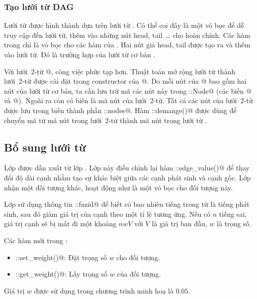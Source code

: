 \documentclass[a4paper,oneside,14pt]{extbook} %
\begin{document}
\subsubsection{Tạo lưới từ DAG}

Lưới từ \verb@DAG@ được hình thành dựa trên lưới từ \verb@Lattice@. Có
thể coi đây là một vỏ bọc để dễ truy cập đến lưới từ, thêm vào những
nút head, tail~\ldots{} cho hoàn chỉnh. Các hàm trong \verb@DAG@ chỉ
là vỏ bọc cho các hàm của \verb@Lattice@. Hai nút giả head, tail được
tạo ra và thêm vào lưới từ. Đó là trường hợp của lưới từ cơ bản
\verb@WordDAG@. 

Với lưới~2-từ @, công việc phức tạp hơn. Thuật toán mở
rộng lưới từ thành lưới~2-từ được cài đặt trong constructor của
@.  Do mỗi nút của @ bao gồm hai nút của
lưới từ cơ bản, ta cần lưu trữ mã các nút này trong
::Node@ (các biến @ và @). Ngoài ra còn
có biến \verb@id@ là mã nút của lưới~2-từ. Tất cả các nút của
lưới~2-từ được lưu trong biến thành phần ::nodes@. Hàm
::demange()@ được dùng để chuyển mã từ mã nút trong
lưới~2-từ thành mã nút trong lưới từ \verb@WordDAG@.



\subsection{Bổ sung lưới từ}

Lớp \verb@PenaltyDAG@ được dẫn xuất từ lớp \verb@DAG@. Lớp này điều
chỉnh lại hàm \verb@DAG::edge_value()@ để thay đổi độ dài cạnh nhằm
tạo sự khác biệt giữa các cạnh phát sinh và cạnh gốc. Lớp nhận một đối
tượng \verb@DAG@ khác, hoạt động như là một vỏ bọc cho đối tượng này.

Lớp sử dụng thông tin \verb@WordEntry::fuzid@ để biết có bao nhiêu
tiếng trong từ là tiếng phát sinh, sau đó giảm giá trị của cạnh theo
một tỉ lệ tương ứng. Nếu có $n$ tiếng sai, giá trị cạnh sẽ bị mất đi
một khoảng $nwV$
với $V$ là giá trị ban đầu, $w$ là trọng số.

Các hàm mới trong \verb@PenaltyDAG@:
\begin{itemize}
\item \verb@PenaltyDAG::set_weight()@: Đặt trọng số $w$ cho đối tượng.
\item \verb@PenaltyDAG::get_weight()@: Lấy trọng số $w$ của đối tượng.
\end{itemize}

Giá trị $w$ được sử dụng trong chương trình minh hoạ là $0.05$. 
\end{document}
